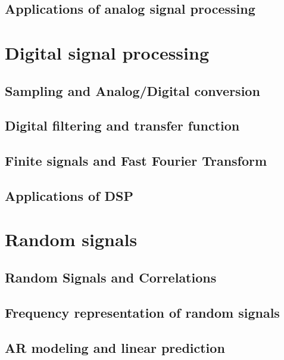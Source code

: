 \documentclass[a4paper, 10pt, dvipsnames]{book}
\begin{document}
\section{Applications of analog signal processing}
\label{sec:appli-ft}

\chapter{Digital signal processing}
\label{chap:dsp}


\section{Sampling and Analog/Digital conversion}
\label{sec:sampling}

\section{Digital filtering and transfer function}
\label{sec:digital_filtering}

\section{Finite signals and Fast Fourier Transform}
\label{sec:finite_signals_fft}

\section{Applications of DSP}
\label{sec:applis_dsp}

\chapter{Random signals}
\label{chap:random}


\section{Random Signals and Correlations}
\label{sec:rand_sig_corr}

\section{Frequency representation of random signals}
\label{sec:freq_resp_random}

\section{AR modeling and linear prediction}
\label{sec:ar_linear}
\end{document}
